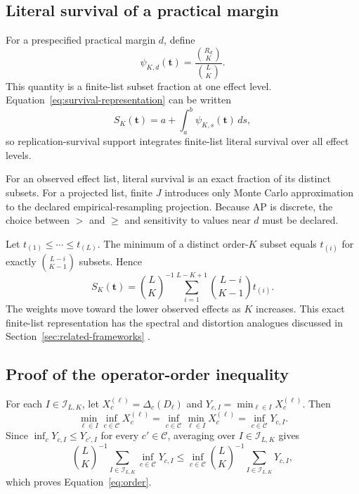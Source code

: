 \documentclass[11pt]{article}
\newcommand{\CSet}{\mathcal{C}}
\theoremstyle{remark}
\begin{document}
\subsection{Literal survival of a practical margin}
\label{app:literal-survival}

For a prespecified practical margin $d$, define
\begin{equation}
\psi_{K,d}(\mathbf t)
=
\frac{\binom{R_d}{K}}{\binom{L}{K}}.
\label{eq:literal-survival}
\end{equation}
This quantity is a finite-list subset fraction at one effect level.
Equation~\eqref{eq:survival-representation} can be written
\[
S_K(\mathbf t)=a+\int_a^b\psi_{K,s}(\mathbf t)\,ds,
\]
so replication-survival support integrates finite-list literal survival over
all effect levels.

For an observed effect list, literal survival is an exact fraction of its
distinct subsets. For a projected list, finite $J$ introduces only Monte Carlo
approximation to the declared empirical-resampling projection. Because AP is
discrete, the choice between $>$ and $\geq$ and sensitivity to values near $d$
must be declared.

Let $t_{(1)}\leq\cdots\leq t_{(L)}$. The minimum of a distinct order-$K$
subset equals $t_{(i)}$ for exactly $\binom{L-i}{K-1}$ subsets. Hence
\begin{equation}
S_K(\mathbf t)
=
\binom{L}{K}^{-1}
\sum_{i=1}^{L-K+1}
\binom{L-i}{K-1}t_{(i)}.
\label{eq:quantile-weight}
\end{equation}
The weights move toward the lower observed effects as $K$ increases. This exact
finite-list representation has the spectral and distortion analogues discussed
in Section~\ref{sec:related-frameworks} \cite{acerbi2002spectral,wang1996premium}.

\subsection{Proof of the operator-order inequality}

For each $I\in\mathcal I_{L,K}$, let
$X_c^{(\ell)}=\Delta_c(D_\ell)$ and
$Y_{c,I}=\min_{\ell\in I}X_c^{(\ell)}$. Then
\[
\min_{\ell\in I}\inf_{c\in\CSet}X_c^{(\ell)}
=
\inf_{c\in\CSet}\min_{\ell\in I}X_c^{(\ell)}
=
\inf_{c\in\CSet}Y_{c,I}.
\]
Since $\inf_c Y_{c,I}\leq Y_{c',I}$ for every $c'\in\CSet$, averaging
over $I\in\mathcal I_{L,K}$ gives
\[
\binom{L}{K}^{-1}\sum_{I\in\mathcal I_{L,K}}
\inf_{c\in\CSet}Y_{c,I}
\leq
\inf_{c\in\CSet}
\binom{L}{K}^{-1}\sum_{I\in\mathcal I_{L,K}}Y_{c,I},
\]
which proves Equation~\eqref{eq:order}.
\end{document}
